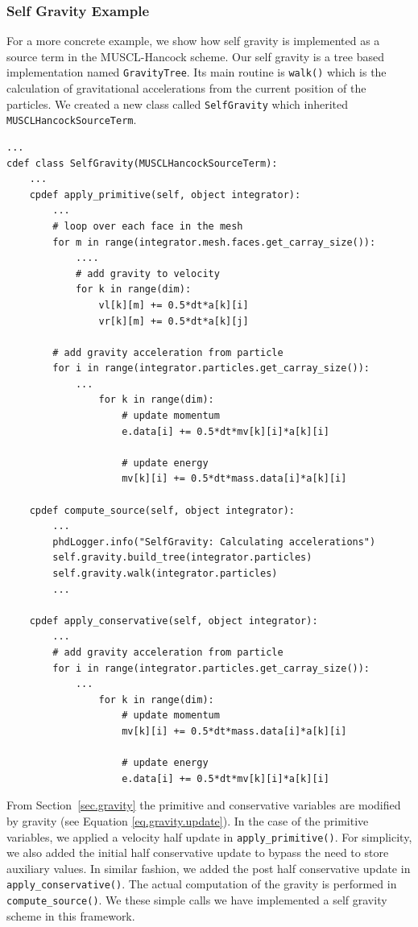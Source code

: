 \subsubsection{Self Gravity Example}
For a more concrete example, we show how self gravity is implemented as a source term
in the MUSCL-Hancock scheme. Our self gravity is a tree based implementation
named \lstinline{GravityTree}. Its main routine is \lstinline{walk()} which is the
calculation of gravitational accelerations from the current position of the particles.
We created a new class called \lstinline{SelfGravity} which inherited \lstinline{MUSCLHancockSourceTerm}. 
\begin{lstlisting}
...
cdef class SelfGravity(MUSCLHancockSourceTerm):
    ...
    cpdef apply_primitive(self, object integrator):
    	...
        # loop over each face in the mesh 
        for m in range(integrator.mesh.faces.get_carray_size()):
            ....
            # add gravity to velocity
            for k in range(dim):
                vl[k][m] += 0.5*dt*a[k][i]
                vr[k][m] += 0.5*dt*a[k][j]

        # add gravity acceleration from particle
        for i in range(integrator.particles.get_carray_size()):
            ...
                for k in range(dim):
                    # update momentum
                    e.data[i] += 0.5*dt*mv[k][i]*a[k][i]

                    # update energy 
                    mv[k][i] += 0.5*dt*mass.data[i]*a[k][i]
                    
    cpdef compute_source(self, object integrator):
    	...
        phdLogger.info("SelfGravity: Calculating accelerations")
        self.gravity.build_tree(integrator.particles)
        self.gravity.walk(integrator.particles)
        ...

    cpdef apply_conservative(self, object integrator):
        ...
        # add gravity acceleration from particle
        for i in range(integrator.particles.get_carray_size()):
            ...
                for k in range(dim):
                    # update momentum
                    mv[k][i] += 0.5*dt*mass.data[i]*a[k][i]

                    # update energy 
                    e.data[i] += 0.5*dt*mv[k][i]*a[k][i]
\end{lstlisting}
From Section~\ref{sec.gravity} the primitive and conservative variables are modified by gravity
(see Equation \ref{eq.gravity.update}). In the case of the primitive variables, we applied a
velocity half update in \lstinline{apply_primitive()}. For simplicity, we also added the initial half 
conservative update to bypass the need to store auxiliary values. In similar fashion,
we added the post half conservative update in \lstinline{apply_conservative()}. The actual computation
of the gravity is performed in \lstinline{compute_source()}. We these simple calls we have implemented
a self gravity scheme in this framework.